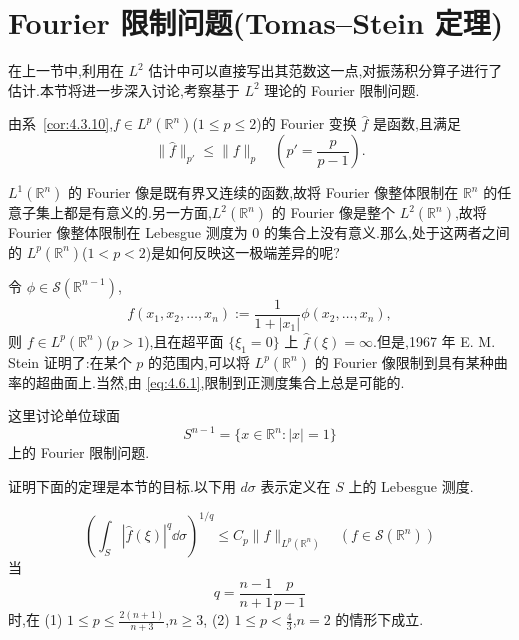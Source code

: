 \section{Fourier 限制问题(Tomas--Stein 定理)}\label{sec:4.6}


在上一节中,利用在 $L^{2}$ 估计中可以直接写出其范数这一点,对振荡积分算子进行了估计.本节将进一步深入讨论,考察基于 $L^{2}$ 理论的 Fourier 限制问题.

由系~\ref{cor:4.3.10},$f \in L^{p}(\mathbb{R}^{n})$($1 \leq p \leq 2$)的 Fourier 变换 $\hat{f}$ 是函数,且满足
\begin{equation}
\|\hat{f}\|_{p'} \leq \|f\|_{p} \quad \left(p' = \frac{p}{p-1}\right).\tag{4.6.1}
\label{eq:4.6.1}\end{equation}

$L^{1}(\mathbb{R}^{n})$ 的 Fourier 像是既有界又连续的函数,故将 Fourier 像整体限制在 $\mathbb{R}^{n}$ 的任意子集上都是有意义的.另一方面,$L^{2}(\mathbb{R}^{n})$ 的 Fourier 像是整个 $L^{2}(\mathbb{R}^{n})$,故将 Fourier 像整体限制在 Lebesgue 测度为 0 的集合上没有意义.那么,处于这两者之间的 $L^{p}(\mathbb{R}^{n})$($1 < p < 2$)是如何反映这一极端差异的呢?

令 $\phi \in \mathcal{S}(\mathbb{R}^{n-1})$,
\begin{equation*}
f(x_{1}, x_{2}, \ldots, x_{n}) := \frac{1}{1 + |x_{1}|}\phi(x_{2}, \ldots, x_{n}),
\end{equation*}
则 $f \in L^{p}(\mathbb{R}^{n})$($p > 1$),且在超平面 $\{\xi_{1} = 0\}$ 上 $\hat{f}(\xi) = \infty$.但是,1967 年 E. M. Stein 证明了:在某个 $p$ 的范围内,可以将 $L^{p}(\mathbb{R}^{n})$ 的 Fourier 像限制到具有某种曲率的超曲面上.当然,由 \eqref{eq:4.6.1},限制到正测度集合上总是可能的.

这里讨论单位球面
\begin{equation*}
S^{n-1} = \{x \in \mathbb{R}^{n}: |x| = 1\}
\end{equation*}
上的 Fourier 限制问题.

证明下面的定理是本节的目标.以下用 $d\sigma$ 表示定义在 $S$ 上的 Lebesgue 测度.

\begin{theorem}\label{thm:4.6.1}
\begin{equation}
\left(\int_{S}|\hat{f}(\xi)|^{q}\dd\sigma\right)^{1/q} \leq C_{p}\|f\|_{L^{p}(\mathbb{R}^{n})} \quad (f \in \mathcal{S}(\mathbb{R}^{n}))\tag{4.6.2}
\label{eq:4.6.2}\end{equation}
当
\begin{equation*}
q = \frac{n-1}{n+1}\frac{p}{p-1}
\end{equation*}
时,在
(1) $1 \leq p \leq \frac{2(n+1)}{n+3}$,$n \geq 3$,
(2) $1 \leq p < \frac{4}{3}$,$n = 2$
的情形下成立.
\end{theorem}


